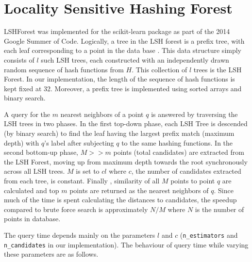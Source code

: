 \documentclass[twoside,11pt]{article}
\begin{document}
\section{Locality Sensitive Hashing Forest}

LSHForest was implemented for the scikit-learn package as part of the 2014 Google Summer of Code.
Logically, a tree in the LSH
forest is a prefix tree, with each leaf corresponding to a point in the data
base \citep{bawa2005lsh}. This data structure simply consists of $l$ such LSH trees, each
constructed with an independently drawn random sequence of hash functions from
$H$. This collection of $l$ trees is the LSH Forest. In our
implementation, the length of the sequence of hash functions is kept fixed at
32. Moreover, a prefix tree is implemented using sorted arrays and binary 
search.

A query for the $m$ nearest neighbors of a point $q$ is answered by
traversing the LSH trees in two phases. In the first top-down phase, each LSH
Tree is descended (by binary search) to find the leaf having the largest prefix
match (maximum depth) with $q$'s label after subjecting $q$ to the
same hashing functions.  In the second bottom-up phase, $M >> m$ points
(total candidates) are extracted from the LSH Forest, moving up from maximum
depth towards the root synchronously across all LSH trees. $M$ is set to
$cl$ where $c$, the number of candidates extracted from each tree,
is constant.
Finally , similarity of all $M$ points to point
$q$ are calculated and top $m$ points are returned as the nearest
neighbors of $q$. Since much of the time is spent calculating the
distances to candidates, the speedup compared to brute force search is
approximately $N/M$ where $N$ is the number of points in database.

The query time depends mainly on the parameters $l$ and $c$
(\texttt{n\_estimators} and \texttt{n\_candidates} in our implementation). The behaviour of
query time while varying these parameters are as follows.
%
%






\end{document}
